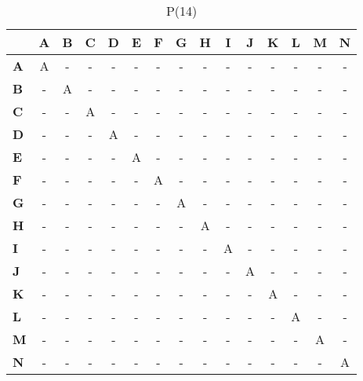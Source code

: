 \documentclass{article}
\begin{document}
\begin{table}[H]\centering
\caption{P(14)}
\begin{tabular}{l c c c c c c c c c c c c c c}
\toprule
 & \textbf{A} & \textbf{B} & \textbf{C} & \textbf{D} & \textbf{E} & \textbf{F} & \textbf{G} & \textbf{H} & \textbf{I} & \textbf{J} & \textbf{K} & \textbf{L} & \textbf{M} & \textbf{N}\\\midrule
\textbf{A} & A & - & - & - & - & - & - & - & - & - & - & - & - & - \\
\textbf{B} & - & A & - & - & - & - & - & - & - & - & - & - & - & - \\
\textbf{C} & - & - & A & - & - & - & - & - & - & - & - & - & - & - \\
\textbf{D} & - & - & - & A & - & - & - & - & - & - & - & - & - & - \\
\textbf{E} & - & - & - & - & A & - & - & - & - & - & - & - & - & - \\
\textbf{F} & - & - & - & - & - & A & - & - & - & - & - & - & - & - \\
\textbf{G} & - & - & - & - & - & - & A & - & - & - & - & - & - & - \\
\textbf{H} & - & - & - & - & - & - & - & A & - & - & - & - & - & - \\
\textbf{I} & - & - & - & - & - & - & - & - & A & - & - & - & - & - \\
\textbf{J} & - & - & - & - & - & - & - & - & - & A & - & - & - & - \\
\textbf{K} & - & - & - & - & - & - & - & - & - & - & A & - & - & - \\
\textbf{L} & - & - & - & - & - & - & - & - & - & - & - & A & - & - \\
\textbf{M} & - & - & - & - & - & - & - & - & - & - & - & - & A & - \\
\textbf{N} & - & - & - & - & - & - & - & - & - & - & - & - & - & A \\
\bottomrule
\end{tabular}
\end{table}
\end{document}
